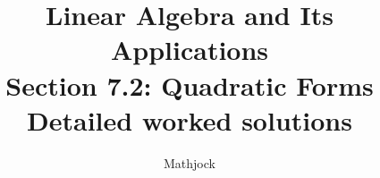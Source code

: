 
\title{\textbf{Linear Algebra and Its Applications}\\[0.3em]Section 7.2: Quadratic Forms\\[0.3em]\large Detailed worked solutions}
\author{Mathjock}
\date{}

\maketitle
\bookinfo
\tableofcontents
\clearpage
\renewcommand{\thesection}{7.\arabic{section}}
\renewcommand{\theHsection}{7.\arabic{section}}
\setcounter{section}{1}


